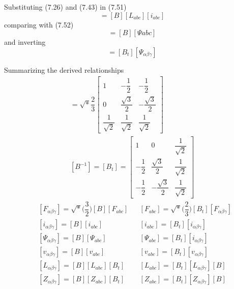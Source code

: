 \documentclass[a4paper,numbers=noenddot,12pt]{scrbook}
\begin{document}
    Substituting (7.26) and (7.43) in (7.51)
    \begin{equation*}
        [\varPsi_{\alpha \beta \gamma}] = [B][L_{abc}][i_{abc}]
    \end{equation*}
    comparing with (7.52)
    \begin{equation}
        [\varPsi_{\alpha \beta \gamma}] = [B][\varPsi{abc}]
        \label{eq:Eq7.53}
    \end{equation}
    and inverting
    \begin{equation}
        [\varPsi{abc}] = [B_t][\varPsi_{\alpha \beta \gamma}]
        \label{eq:Eq7.54}
    \end{equation}

    Summarizing the derived relationships
    \begin{multline*}
        [B] = \sqrt*{\dfrac{2}{3}} 
        \begin{bmatrix}
            1 & - \dfrac{1}{2} & - \dfrac{1}{2} \\[2ex]
            0 & \dfrac{\sqrt{3}}{2} & - \dfrac{\sqrt{3}}{2} \\[2ex]
            \dfrac{1}{\sqrt{2}} & \dfrac{1}{\sqrt{2}} & \dfrac{1}{\sqrt{2}}
        \end{bmatrix} \\
        [B^{-1}] = [B_t] = 
        \begin{bmatrix}
            1 & 0 & \dfrac{1}{\sqrt{2}} \\[2ex]
            - \dfrac{1}{2} & \dfrac{\sqrt{3}}{2} & \dfrac{1}{\sqrt{2}} \\[2ex]
            - \dfrac{1}{2} & - \dfrac{\sqrt{3}}{2} & \dfrac{1}{\sqrt{2}}
        \end{bmatrix}
        \label{}
    \end{multline*}
    \begin{equation}
        \begin{aligned}
            &[F_{\alpha \beta \gamma}] = \sqrt*{\Big( \dfrac{3}{2}\Big)} [B] [F_{abc}] && [F_{abc}] = \sqrt*{\Big(\dfrac{2}{3}\Big)}[B_t][F_{\alpha \beta \gamma}] \\
            &[i_{\alpha \beta \gamma}] =[B][i_{abc}] && [i_{abc}] = [B_t][i_{\alpha \beta \gamma}] \\
            & [\varPsi_{\alpha \beta \gamma}] = [B][\varPsi_{abc}] && [\varPsi_{abc}] = [B_t][i_{\alpha \beta \gamma}] \\
            &[v_{\alpha \beta \gamma}] = [B][v_{abc}] && [v_{abc}] = [B_t][v_{\alpha \beta\gamma}] \\
            & [L_{\alpha \beta \gamma}] = [B][L_{abc}][B_t] && [L_{abc}] = [B_t][L_{\alpha \beta \gamma}][B] \\
            & [Z_{\alpha \beta \gamma}] = [B][Z_{abc}][B_t] && [Z_{abc}] = [B_t][Z_{\alpha \beta \gamma}][B]
        \end{aligned}
        \label{eq:Eq7.55}
    \end{equation}
\end{document}
